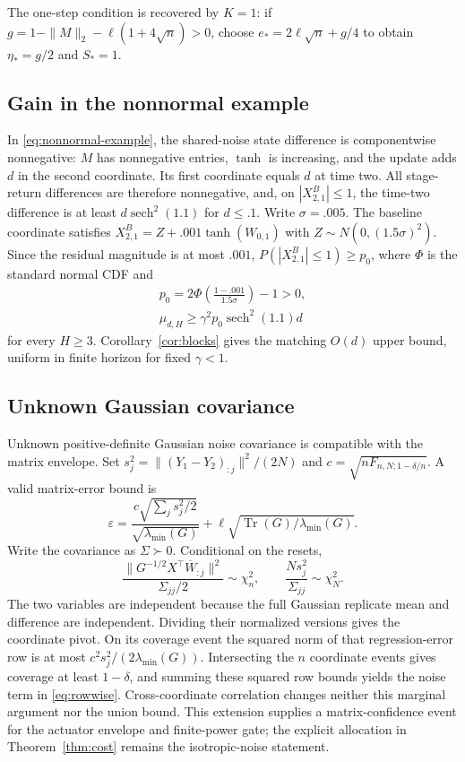 \documentclass[twocolumn,nameyear]{autart}
\begin{document}
The one-step condition is recovered by $K=1$: if
$g=1-\|M\|_2-\ell(1+4\sqrt n)>0$, choose
$e_*=2\ell\sqrt n+g/4$ to obtain $\eta_*=g/2$ and $S_*=1$.

\subsection{Gain in the nonnormal example}\label{app:example}
In \eqref{eq:nonnormal-example}, the shared-noise state difference
is componentwise nonnegative: $M$ has nonnegative entries, $\tanh$
is increasing, and the update adds $d$ in the second coordinate.
Its first coordinate equals $d$ at time two. All stage-return
differences are therefore nonnegative, and, on $|X_{2,1}^B|\le1$,
the time-two difference is at least $d\operatorname{sech}^2(1.1)$
for $d\le.1$. Write $\sigma=.005$. The baseline coordinate satisfies
$X_{2,1}^B=Z+.001\tanh(W_{0,1})$ with
$Z\sim N(0,(1.5\sigma)^2)$. Since the residual magnitude is at most
$.001$, $P(|X_{2,1}^B|\le1)\ge p_0$, where $\Phi$ is the standard
normal CDF and
\begin{align*}
 p_0=2\Phi\!\left(\frac{1-.001}{1.5\sigma}\right)-1>0,
 \\ \mu_{d,H}\ge\gamma^2p_0\operatorname{sech}^2(1.1)d
\end{align*}
for every $H\ge3$. Corollary~\ref{cor:blocks} gives the matching
$O(d)$ upper bound, uniform in finite horizon for fixed $\gamma<1$.

\subsection{Unknown Gaussian covariance}\label{app:covariance}
Unknown positive-definite Gaussian noise covariance is compatible with the matrix
envelope. Set $s_j^2=\|(Y_1-Y_2)_{:j}\|^2/(2N)$ and
$c=\sqrt{nF_{n,N;1-\delta/n}}$. A valid matrix-error bound is
\begin{equation}\label{eq:rowwise}
 \varepsilon=\frac{c\sqrt{\sum_j s_j^2/2}}
                  {\sqrt{\lambda_{\min}(G)}}
       +\ell\sqrt{\operatorname{Tr}(G)/\lambda_{\min}(G)}.
\end{equation}
Write the covariance as $\Sigma\succ0$. Conditional on the resets,
\[
 \frac{\|G^{-1/2}X^\top\overline W_{:j}\|^2}
             {\Sigma_{jj}/2}\sim\chi_n^2,
 \qquad \frac{Ns_j^2}{\Sigma_{jj}}\sim\chi_N^2.
\]
The two variables are independent because the full Gaussian replicate
mean and difference are independent. Dividing their normalized versions
gives the coordinate pivot. On its coverage event the squared norm of
that regression-error row is at most
$c^2s_j^2/(2\lambda_{\min}(G))$. Intersecting the $n$ coordinate
events gives coverage at least $1-\delta$, and summing these squared
row bounds yields the noise term in \eqref{eq:rowwise}. Cross-coordinate
correlation changes neither this marginal argument nor the union bound.
This extension supplies a matrix-confidence event for the actuator
envelope and finite-power gate; the explicit allocation in
Theorem~\ref{thm:cost} remains the isotropic-noise statement.
\end{document}
